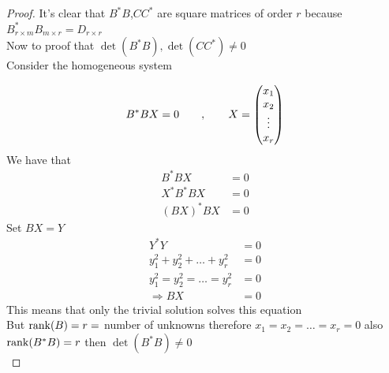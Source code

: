 \begin{proof}[\textcolor{theme}{Proof}]
    It's clear that $B^{*}B$,$CC^{*}$ are square matrices of order $r$ because $B_{r \times m}^{*}B_{m \times r} = D_{r \times r}$
    \\
    Now to proof that $\det(B^{*}B) ,\det(CC^{*}) \neq 0 $
    \\
    Consider the homogeneous system

    \[
        B^{*}B X = 0  \quad\quad,\quad\quad X = \begin{pmatrix}
            x_1    \\
            x_2    \\
            \vdots \\
            x_r    \\
        \end{pmatrix}
    \]
    We have that
    \begin{align*}
        B^{*}B X      & = 0 \tag{multiply $X^*$ from the left}
        \\
        X^{*}B^{*}B X & = 0
        \\
        (BX)^{*}BX    & = 0
    \end{align*}
    Set $BX = Y$
    \begin{align*}
        Y^{*}Y                              & = 0
        \\
        y_1^{2} + y_2^{2} + \dots + y_r^{2} & = 0
        \\
        y_1^{2} = y_2^{2} = \dots = y_r^{2} & = 0
        \\
        \Longrightarrow BX                  & = 0
    \end{align*}
    This means that only the trivial solution solves this equation
    \\
    But $\rank(B)=r=$ number of unknowns therefore $x_1 = x_2 = \dots = x_r = 0$
    also $\rank(B^{*}B)=r$ then $\det(B^{*}B) \neq 0$
    \\
\end{proof}

